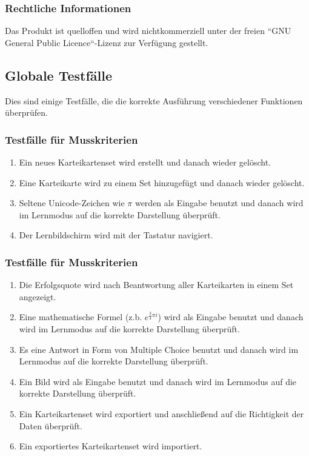 \subsubsection{Rechtliche Informationen}
Das Produkt ist quelloffen und wird nichtkommerziell unter der freien ``GNU General Public Licence``-Lizenz zur Verfügung gestellt. 

\newpage
\subsection{Globale Testfälle}
Dies sind einige Testfälle, die die korrekte Ausführung verschiedener Funktionen überprüfen.

\subsubsection{Testfälle für Musskriterien}
\begin{enumerate}[leftmargin=2cm, label=\bfseries /TM\arabic*0/]
	\item Ein neues Karteikartenset wird erstellt und danach wieder gelöscht.
	\item Eine Karteikarte wird zu einem Set hinzugefügt und danach wieder gelöscht.
	\item Seltene Unicode-Zeichen wie \(\pi\) werden als Eingabe benutzt und danach wird im Lernmodus auf die korrekte Darstellung überprüft.
	\item Der Lernbildschirm wird mit der Tastatur navigiert.
\end{enumerate}

\subsubsection{Testfälle für Musskriterien}
\begin{enumerate}[leftmargin=2cm, label=\bfseries /TW\arabic*0/]
	\item Die Erfolgsquote wird nach Beantwortung aller Karteikarten in einem Set angezeigt.
	\item Eine mathematische Formel (z.b. \( e^{\frac{3}{4}\pi i}\)) wird als Eingabe benutzt und danach wird im Lernmodus auf die korrekte Darstellung überprüft.
	\item Es eine Antwort in Form von Multiple Choice benutzt und danach wird im Lernmodus auf die korrekte Darstellung überprüft.
	\item Ein Bild wird als Eingabe benutzt und danach wird im Lernmodus auf die korrekte Darstellung überprüft.
	\item\label{test-export} Ein Karteikartenset wird exportiert und anschließend auf die Richtigkeit der Daten überprüft.
	\item Ein exportiertes Karteikartenset wird importiert.
\end{enumerate}



